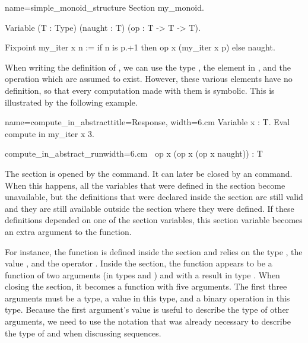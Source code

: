 \begin{coq}{name=simple_monoid_structure}{}
Section my_monoid.

Variable (T : Type) (naught : T) (op : T -> T -> T).

Fixpoint my_iter x n :=
  if n is p.+1 then op x (my_iter x p) else naught.
\end{coq}
When writing the definition of , we can use the type
, the element in , and the operation  which are
assumed to exist.  However, these various elements have no
definition, so that every computation made with them is symbolic.
This is illustrated by the following example.

\begin{coq}{name=compute_in_abstract}{title=Response, width=6.cm}
Variable x : T.
Eval compute in my_iter x 3.
\end{coq}
\begin{coqout}{compute_in_abstract_run}{width=6.cm}
$~$
op x (op x (op x naught)) : T
\end{coqout}
The section is opened by the  command.  It can later be
closed by an  command.  When this happens, all the variables
that were defined in the section become unavailable, but the
definitions that were declared inside the section are still valid and
they are still available outside the section where they were defined.
If these definitions depended on one of the section variables, this
section variable becomes an extra argument to the function.

For instance, the function  is defined inside the section
and relies on the type , the value , and the operator
.  Inside the section, the function  appears to be a
function of two arguments (in types  and ) and with a
result in type .  When closing the section, it becomes a function
with five arguments.  The first three arguments must be a type, a
value in this type, and a binary operation in this type.  Because the
first argument's value is useful to describe the type of other
arguments, we need to use the notation  that was already
necessary to describe the type of  and  when discussing
sequences.

